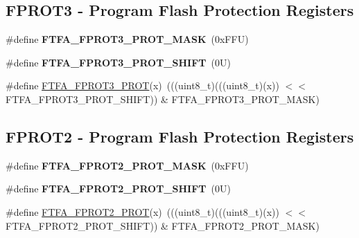 \subsection*{F\+P\+R\+O\+T3 -\/ Program Flash Protection Registers}
\begin{DoxyCompactItemize}
\item 
\mbox{\label{group___f_t_f_a___register___masks_gaa5d3fe6e00716f1d147e22799ba5b7ae}} 
\#define {\bfseries F\+T\+F\+A\+\_\+\+F\+P\+R\+O\+T3\+\_\+\+P\+R\+O\+T\+\_\+\+M\+A\+SK}~(0x\+F\+F\+U)
\item 
\mbox{\label{group___f_t_f_a___register___masks_ga35d09e54593dc5d05e0946e9ca3ae42b}} 
\#define {\bfseries F\+T\+F\+A\+\_\+\+F\+P\+R\+O\+T3\+\_\+\+P\+R\+O\+T\+\_\+\+S\+H\+I\+FT}~(0\+U)
\item 
\#define \mbox{\hyperlink{group___f_t_f_a___register___masks_gac94c3029a8dbe39595bf14c61e4a8e95}{F\+T\+F\+A\+\_\+\+F\+P\+R\+O\+T3\+\_\+\+P\+R\+OT}}(x)~(((uint8\+\_\+t)(((uint8\+\_\+t)(x)) $<$$<$ F\+T\+F\+A\+\_\+\+F\+P\+R\+O\+T3\+\_\+\+P\+R\+O\+T\+\_\+\+S\+H\+I\+FT)) \& F\+T\+F\+A\+\_\+\+F\+P\+R\+O\+T3\+\_\+\+P\+R\+O\+T\+\_\+\+M\+A\+SK)
\end{DoxyCompactItemize}
\subsection*{F\+P\+R\+O\+T2 -\/ Program Flash Protection Registers}
\begin{DoxyCompactItemize}
\item 
\mbox{\label{group___f_t_f_a___register___masks_ga17b0f04e6c61b3683a99ef21674d8329}} 
\#define {\bfseries F\+T\+F\+A\+\_\+\+F\+P\+R\+O\+T2\+\_\+\+P\+R\+O\+T\+\_\+\+M\+A\+SK}~(0x\+F\+F\+U)
\item 
\mbox{\label{group___f_t_f_a___register___masks_ga7c2381deecb19163451591155ba5a05e}} 
\#define {\bfseries F\+T\+F\+A\+\_\+\+F\+P\+R\+O\+T2\+\_\+\+P\+R\+O\+T\+\_\+\+S\+H\+I\+FT}~(0\+U)
\item 
\#define \mbox{\hyperlink{group___f_t_f_a___register___masks_gab3afd3ff3730b2fa996e86e53260db59}{F\+T\+F\+A\+\_\+\+F\+P\+R\+O\+T2\+\_\+\+P\+R\+OT}}(x)~(((uint8\+\_\+t)(((uint8\+\_\+t)(x)) $<$$<$ F\+T\+F\+A\+\_\+\+F\+P\+R\+O\+T2\+\_\+\+P\+R\+O\+T\+\_\+\+S\+H\+I\+FT)) \& F\+T\+F\+A\+\_\+\+F\+P\+R\+O\+T2\+\_\+\+P\+R\+O\+T\+\_\+\+M\+A\+SK)
\end{DoxyCompactItemize}
